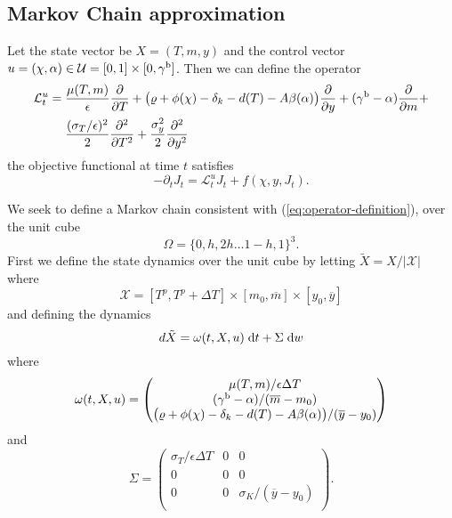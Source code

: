\documentclass[../../main.tex]{subfiles}
\begin{document}
\subsection{Markov Chain approximation}

Let the state vector be $X = (T, m, y)$ and the control vector $u = (\chi, \alpha) \in \mathcal{U} = [0, 1] \times [0, \gamma^{\mathrm{b}}]$. Then we can define the operator \begin{equation}
    \begin{split}
        \mathcal{L}_t^u = \; &\frac{\mu(T, m)}{\epsilon} \frac{\partial}{\partial T} + \big(\varrho + \phi(\chi) - \delta_k - d(T) - A \beta(\alpha) \big) \frac{\partial}{\partial y} + (\gamma^{\mathrm{b}} - \alpha)\frac{\partial}{\partial m} + \\
        &\frac{(\sigma_T / \epsilon)^2}{2} \frac{\partial^2}{\partial T^2} + \frac{\sigma^2_y}{2} \frac{\partial^2}{\partial y^2} 
    \end{split}
\end{equation} the objective functional at time $t$ satisfies \begin{equation} \label{eq:operator-definition}
    -\partial_t J_t =  \mathcal{L}_t^u J_t + f(\chi, y, J_t).
\end{equation}

We seek to define a Markov chain consistent with (\ref{eq:operator-definition}), over the unit cube \begin{equation}\Omega = \{0, h, 2h \ldots 1 - h, 1\}^3.\end{equation} First we define the state dynamics over the unit cube by letting $\tilde{X} = X / \lvert\mathcal{X}\rvert$ where \begin{equation}
    \mathcal{X} = [T^p, T^p + \Delta T] \times [m_0, \overline{m}] \times [y_0, \overline{y}]
\end{equation} and defining the dynamics \begin{equation}
    d \tilde{X} = \omega(t, X, u) \; \mathrm{d}t + \Sigma \; \mathrm{d}w
\end{equation} where \begin{equation}
    \omega(t, X, u) = \begin{pmatrix}
        \mu(T, m) / \epsilon \Delta T \\
        (\gamma^{\mathrm{b}} - \alpha) / (\overline{m} - m_0) \\
        \big(\varrho + \phi(\chi) - \delta_k - d(T) - A \beta(\alpha) \big) / (\overline{y} - y_0)
    \end{pmatrix} 
\end{equation} and \begin{equation}
    \Sigma = \begin{pmatrix}
        \sigma_T / \epsilon \Delta T  & 0 & 0 \\
        0 & 0 & 0 \\
        0 & 0 & \sigma_K / (\overline{y} - y_0)\\
    \end{pmatrix}.
\end{equation}
\end{document}

